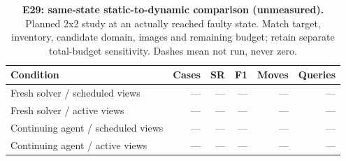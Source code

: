 \begin{table}[!ht]
\centering\small
\caption{\textbf{E29: same-state static-to-dynamic comparison (unmeasured).} Planned 2x2 study at an actually reached faulty state. Match target, inventory, candidate domain, images and remaining budget; retain separate total-budget sensitivity. Dashes mean not run, never zero.}
\begin{tabularx}{\textwidth}{@{}Xrrrrr@{}}\toprule
Condition & Cases & SR & F1 & Moves & Queries\\\midrule
Fresh solver / scheduled views & --- & --- & --- & --- & ---\\
Fresh solver / active views & --- & --- & --- & --- & ---\\
Continuing agent / scheduled views & --- & --- & --- & --- & ---\\
Continuing agent / active views & --- & --- & --- & --- & ---\\
\bottomrule
\end{tabularx}
\end{table}
